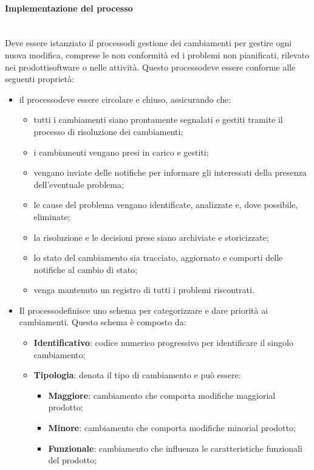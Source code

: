 \paragraph{Implementazione del processo}\mbox{}\\ [1mm]
Deve essere istanziato il processo\glosp di gestione dei cambiamenti per gestire ogni nuova modifica, comprese le non conformità ed i problemi non pianificati, rilevato nei prodotti\glosp software o nelle attività. Questo processo\glosp deve essere conforme alle seguenti proprietà:
\begin{itemize}
	\item il processo\glosp deve essere circolare e chiuso, assicurando che:
	\begin{itemize} 
		\item tutti i cambiamenti siano prontamente segnalati e gestiti tramite il processo di risoluzione dei cambiamenti;
		\item i cambiamenti vengano presi in carico e gestiti;
		\item vengano inviate delle notifiche per informare gli interessati della presenza dell'eventuale problema;
		\item le cause del problema vengano identificate, analizzate e, dove possibile, eliminate;
		\item la risoluzione e le decisioni prese siano archiviate e storicizzate;
		\item lo stato del cambiamento sia tracciato, aggiornato e comporti delle notifiche al cambio di stato;
		\item venga mantenuto un registro di tutti i problemi riscontrati.
	\end{itemize}
	\item Il processo\glosp definisce uno schema per categorizzare e dare priorità ai cambiamenti. Questo schema è composto da:
	\begin{itemize} 
		\item \textbf{Identificativo}: codice numerico progressivo per identificare il singolo cambiamento;
		\item \textbf{Tipologia}: denota il tipo di cambiamento e può essere:
		\begin{itemize}
			\item \textbf{Maggiore}: cambiamento che comporta modifiche maggiori\glosp al prodotto;
			\item \textbf{Minore}: cambiamento che comporta modifiche minori\glosp al prodotto;
			\item \textbf{Funzionale}: cambiamento che influenza le caratteristiche funzionali del prodotto\glosp;

\end{itemize}
\end{itemize}
\end{itemize}
